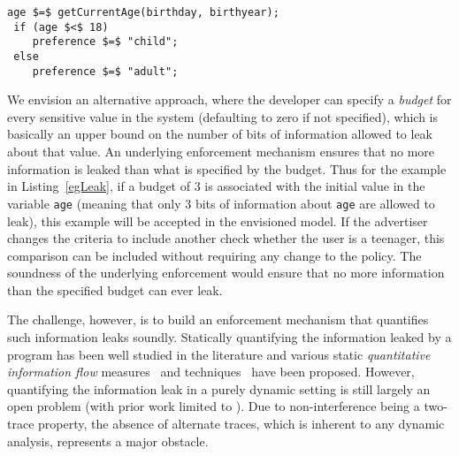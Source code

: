 \begin{lstlisting}[float,belowskip=-0.5em,caption=Age-based Advertisement, label=egLeak]
 age $=$ getCurrentAge(birthday, birthyear);
 if (age $<$ 18)
    preference $=$ "child";
 else
    preference $=$ "adult";
\end{lstlisting}


We envision an alternative approach, where the developer can specify a
\emph{budget} for every sensitive value in the system (defaulting to
zero if not specified), which is basically an upper bound on the
number of bits of information allowed to leak about that value. An
underlying enforcement mechanism 
ensures that no more information is leaked than what is specified by
the budget. Thus for the example in Listing~\ref{egLeak}, if a budget of
$3$ is associated with the initial value in the variable
\lstinline{age} (meaning that only $3$ bits of information about
\lstinline{age} are allowed to leak), this example will be
accepted in the envisioned model. If the advertiser changes
the criteria to include another check whether the user is a
teenager, this comparison can be included without requiring
any change to the policy.
The soundness of the underlying enforcement would ensure that no more
information than the specified budget can ever leak. 

The challenge, however, is to build an enforcement mechanism that
quantifies such information leaks soundly. Statically quantifying the 
information leaked by a program has been well studied in
the literature and various static \emph{quantitative information flow}
measures~\cite{shannon, guessing, smith2009, clarkson2009,
  csf12GLeakage} and techniques~\cite{denning82, clark, clarkson2009, smith2009,
  backes, kopf} have been proposed.   
However, quantifying the information leak in a purely dynamic setting is still largely an open
problem (with prior work limited to  
\cite{mccamant}). Due to non-interference being a two-trace property, the absence 
of alternate traces, which is inherent to any dynamic analysis, represents a major obstacle.

